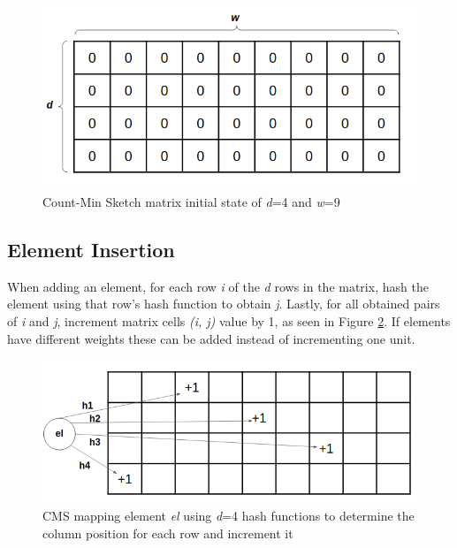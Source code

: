 \begin{figure}[!htb]
    \begin{center}
      \includegraphics[scale=0.5]{figures/initial-cms.png}
      \caption[Count-Min Sketch initial state]{Count-Min Sketch matrix initial state of \textit{d}=4 and \textit{w}=9}
      \label{fig:initial-cms}
    \end{center}
\end{figure}

\subsection*{Element Insertion}
When adding an element, for each row \textit{i} of the \textit{d} rows in the matrix, hash the element using that row's hash function to obtain \textit{j}. Lastly, for all obtained pairs of \textit{i} and \textit{j}, increment matrix cells \textit{(i, j)} value by 1, as seen in Figure \ref{fig:cms}. If elements have different weights these can be added instead of incrementing one unit.

\begin{figure}[!htb]
    \begin{center}
      \includegraphics[scale=0.5]{figures/insertion-cms.png}
      \caption[Count-Min Sketch insertion]{CMS mapping element \textit{el} using \textit{d}=4 hash functions to determine the column position for each row and increment it}
      \label{fig:cms}
    \end{center}
\end{figure}

